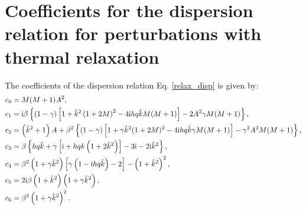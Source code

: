 


\section{Coefficients for the dispersion relation for perturbations
with thermal relaxation}\label{relax_coeff}
The coefficients of the dispersion relation Eq. \ref{relax_disp} is
given by:
\begin{align}
  &c_0 = M(M+1)A^2,\\
  &c_1 = \mathrm{i}\beta\left\{\left(1-\gamma\right)\left[1 +
      \hat{k}^2\left(1+2M\right)^2 - 4 \mathrm{i} h q\hat{k} M (M+1)\right] 
    - 2A^2\gamma M (M+1)\right\},\\
  &c_2 = \left(\hat{k}^2 + 1\right)A + \beta^2\left\{(1-\gamma)\left[1
      + \gamma \hat{k}^2(1+2M)^2 - 4\mathrm{i} h q \hat{k} \gamma M(M+1)
    \right]
    -\gamma^2 A^2 M(M+1)
  \right\},\\
  &c_3 = \beta\left\{h q \hat{k} + \gamma \left[\mathrm{i} + h q
      k \left(1+2\hat{k}^2\right)\right] - 3\mathrm{i} - 2\mathrm{i}
    \hat{k}^2\right\},\\
  &c_4 =
  \beta^2\left(1+\gamma\hat{k}^2\right)\left[\gamma\left(1-\mathrm{i} h q
    \hat{k}\right)-2\right] - \left(1+\hat{k}^2\right)^2,\\
&c_5 = 2\mathrm{i}\beta\left(1+\hat{k}^2\right)\left(1+\gamma\hat{k}^2\right),\\
&c_6 = \beta^2\left(1+\gamma\hat{k}^2\right)^2.
\end{align}

